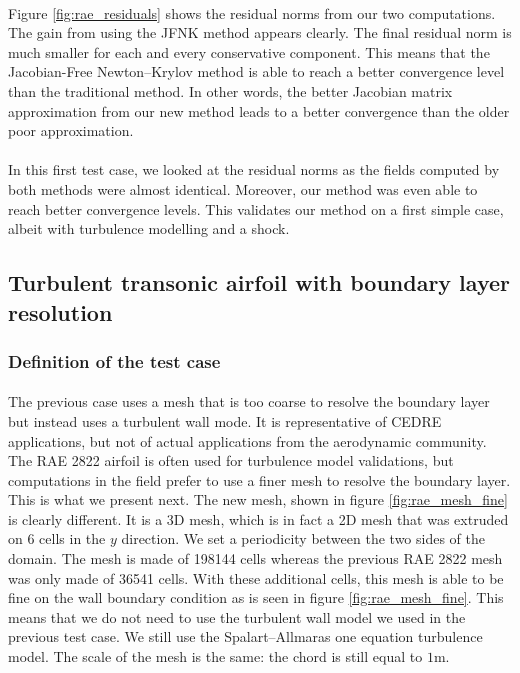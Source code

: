         \paragraph{}
        Figure \ref{fig:rae_residuals} shows the residual norms from our two computations.
        The gain from using the JFNK method appears clearly.
        The final residual norm is much smaller for each and every conservative component.
        This means that the Jacobian-Free Newton--Krylov method is able to reach a better convergence level than the traditional method.
        In other words, the better Jacobian matrix approximation from our new method leads to a better convergence than the older poor approximation.

        \paragraph{}
        In this first test case, we looked at the residual norms as the fields computed by both methods were almost identical.
        Moreover, our method was even able to reach better convergence levels.
        This validates our method on a first simple case, albeit with turbulence modelling and a shock.


    \subsection{Turbulent transonic airfoil with boundary layer resolution}

      \subsubsection{Definition of the test case}

        \paragraph{}
        The previous case uses a mesh that is too coarse to resolve the boundary layer but instead uses a turbulent wall mode.
        It is representative of CEDRE applications, but not of actual applications from the aerodynamic community.
        The RAE 2822 airfoil is often used for turbulence model validations, but computations in the field prefer to use a finer mesh to resolve the boundary layer.
        This is what we present next.
        The new mesh, shown in figure \ref{fig:rae_mesh_fine} is clearly different.
        It is a 3D mesh, which is in fact a 2D mesh that was extruded on 6 cells in the $y$ direction.
        We set a periodicity between the two sides of the domain.
        The mesh is made of 198144 cells whereas the previous RAE 2822 mesh was only made of 36541 cells.
        With these additional cells, this mesh is able to be fine on the wall boundary condition as is seen in figure \ref{fig:rae_mesh_fine}.
        This means that we do not need to use the turbulent wall model we used in the previous test case.
        We still use the Spalart--Allmaras one equation turbulence model.
        The scale of the mesh is the same: the chord is still equal to $1\si{\meter}$.


